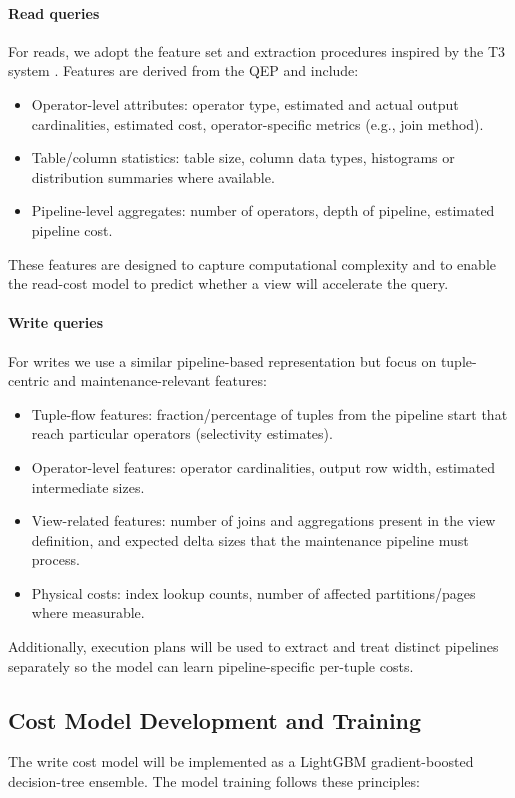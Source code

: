 \paragraph{Read queries}
For reads, we adopt the feature set and extraction procedures inspired by the T3 system \cite{rieger2025t3}. Features are derived from the QEP and include:
\begin{itemize}
    \item Operator-level attributes: operator type, estimated and actual output cardinalities, estimated cost, operator-specific metrics (e.g., join method).
    \item Table/column statistics: table size, column data types, histograms or distribution summaries where available.
    \item Pipeline-level aggregates: number of operators, depth of pipeline, estimated pipeline cost.
\end{itemize}
These features are designed to capture computational complexity and to enable the read-cost model to predict whether a view will accelerate the query.

\paragraph{Write queries}
For writes we use a similar pipeline-based representation but focus on tuple-centric and maintenance-relevant features:
\begin{itemize}
    \item Tuple-flow features: fraction/percentage of tuples from the pipeline start that reach particular operators (selectivity estimates).
    \item Operator-level features: operator cardinalities, output row width, estimated intermediate sizes.
    \item View-related features: number of joins and aggregations present in the view definition, and expected delta sizes that the maintenance pipeline must process.
    \item Physical costs: index lookup counts, number of affected partitions/pages where measurable.
\end{itemize}
Additionally, execution plans will be used to extract and treat distinct pipelines separately so the model can learn pipeline-specific per-tuple costs.

\subsection{Cost Model Development and Training}
\label{sec:cost_model}
The write cost model will be implemented as a LightGBM gradient-boosted decision-tree ensemble. The model training follows these principles:

